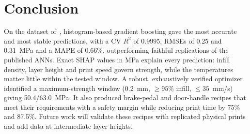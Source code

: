 \documentclass[conference,12pt]{IEEEtran}
\begin{document}
\section{Conclusion}
\label{sec:conclusion}
On the dataset of~\cite{munshi2026}, histogram-based gradient boosting gave the most accurate and most stable predictions, with a CV $R^2$ of 0.9995, RMSEs of 0.25 and 0.31~MPa and a MAPE of 0.66\%, outperforming faithful replications of the published ANNs. Exact SHAP values in MPa explain every prediction: infill density, layer height and print speed govern strength, while the temperatures matter little within the tested window. A robust, exhaustively verified optimizer identified a maximum-strength window (0.2~mm, $\geq 95$\% infill, $\leq 35$~mm/s) giving 50.4/63.0~MPa. It also produced brake-pedal and door-handle recipes that meet their requirements with a safety margin while reducing print time by 75\% and 87.5\%. Future work will validate these recipes with replicated physical prints and add data at intermediate layer heights.
\end{document}
